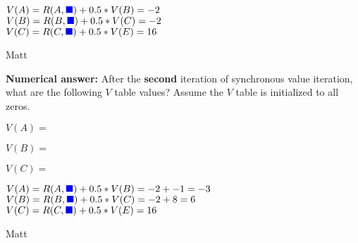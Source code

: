 \begin{parts}
\begin{subparts}
    \begin{soln}
    $V(A) = R(A, \text{\color{blue}$\blacksquare$}) + 0.5 * V(B) = -2$ \\
    $V(B) = R(B, \text{\color{blue}$\blacksquare$}) + 0.5 * V(C) = -2$ \\
    $V(C) = R(C, \text{\color{blue}$\blacksquare$}) + 0.5 * V(E) = 16$ \\
    \end{soln}
    \begin{qauthor}    Matt    \end{qauthor}
    
\subpart[2] \textbf{Numerical answer:} After the \textbf{second} iteration of synchronous value iteration, what are the following $V$ table values? Assume the $V$ table is initialized to all zeros.

    $V(A) = $
    \begin{tcolorbox}[fit,height=1cm, width=2cm, blank, borderline={1pt}{-2pt}, nobeforeafter]
    \end{tcolorbox}
    \hspace{1em}
    $V(B) = $
    \begin{tcolorbox}[fit,height=1cm, width=2cm, blank, borderline={1pt}{-2pt}, nobeforeafter]
    \end{tcolorbox}
    \hspace{1em}
    $V(C) = $
    \begin{tcolorbox}[fit,height=1cm, width=2cm, blank, borderline={1pt}{-2pt}, nobeforeafter]
    \end{tcolorbox}
    
    \begin{soln}
    $V(A) = R(A, \text{\color{blue}$\blacksquare$}) + 0.5 * V(B) = -2 + -1 = -3$ \\
    $V(B) = R(B, \text{\color{blue}$\blacksquare$}) + 0.5 * V(C) = -2 + 8 = 6$ \\
    $V(C) = R(C, \text{\color{blue}$\blacksquare$}) + 0.5 * V(E) = 16$ \\
    \end{soln}
    \begin{qauthor}    Matt    \end{qauthor}




\end{subparts}
\end{parts}
